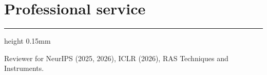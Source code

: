 \documentclass[10pt]{extarticle}
\newcommand{\hrulesp}[1]{%
  \vspace{-3.0mm}
  \hrule height 0.15mm
  \vspace{#1}
}
\begin{document}
\vspace{-3mm}
\section*{Professional service}
\hrulesp{2mm}

Reviewer for NeurIPS (2025, 2026), ICLR (2026), RAS Techniques and Instruments.




\end{document}
